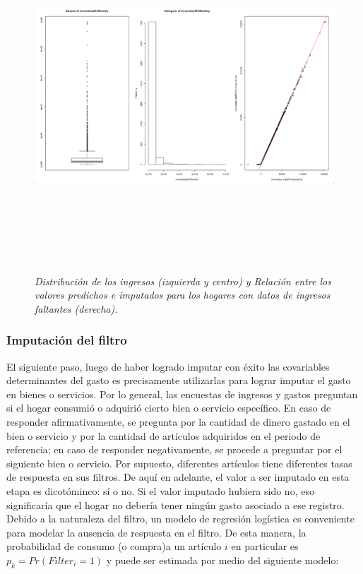 \documentclass[
  10pt,
  spanish,
]{book}
\begin{document}
\begin{figure}
\centering
\includegraphics[width=\textwidth,height=5.20833in]{Pics/10.png}
\caption{\emph{Distribución de los ingresos (izquierda y centro) y Relación entre los valores predichos e imputados para los hogares con datos de ingresos faltantes (derecha).}}
\end{figure}

\hypertarget{imputaciuxf3n-del-filtro}{%
\subsubsection*{Imputación del filtro}\label{imputaciuxf3n-del-filtro}}

El siguiente paso, luego de haber logrado imputar con éxito las covariables determinantes del gasto es precisamente utilizarlas para lograr imputar el gasto en bienes o servicios. Por lo general, las encuestas de ingresos y gastos preguntan si el hogar consumió o adquirió cierto bien o servicio específico. En caso de responder afirmativamente, se pregunta por la cantidad de dinero gastado en el bien o servicio y por la cantidad de artículos adquiridos en el periodo de referencia; en caso de responder negativamente, se procede a preguntar por el siguiente bien o servicio. Por supuesto, diferentes artículos tiene diferentes tasas de respuesta en sus filtros. De aquí en adelante, el valor a ser imputado en esta etapa es dicotóminco: sí o no. Si el valor imputado hubiera sido no, eso significaría que el hogar no debería tener ningún gasto asociado a ese registro. Debido a la naturaleza del filtro, un modelo de regresión logística es conveniente para modelar la ausencia de respuesta en el filtro. De esta manera, la probabilidad de consumo (o compra)a un artículo \(i\) en particular es \(p_k = Pr(Filter_i = 1)\) y puede ser estimada por medio del siguiente modelo:
\end{document}
